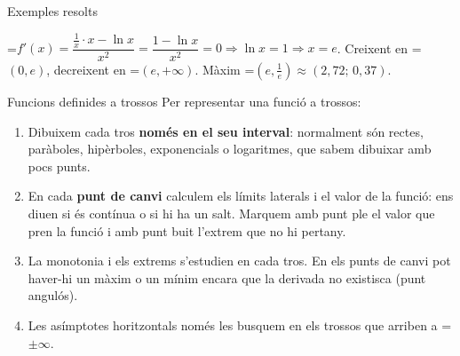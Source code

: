 \documentclass[11pt,a4paper]{article}
\newcommand{\fmm}[1]{\setbox0=\hbox{$#1$}\ifdim\wd0>\linewidth\[#1\]\else\mbox{\box0}\fi}
\begin{document}
\begin{fmex}{Exemples resolts}
\begin{enumerate}[label=\textbf{\arabic*.},leftmargin=*]
            

\fmm{f'(x)=\dfrac{\frac1x\cdot x-\ln x}{x^2}=\dfrac{1-\ln x}{x^2}=0\Rightarrow\ln x=1\Rightarrow x=e}. Creixent en \fmm{(0,e)}, decreixent en \fmm{(e,+\infty)}. Màxim \fmm{\left(e,\frac1e\right)\approx(2{,}72;\,0{,}37)}.

            

\begin{center}\end{center}
\end{enumerate}
\end{fmex}

  
\begin{fmdef}{Funcions definides a trossos}
Per representar una funció a trossos:

      
\begin{enumerate}
\item Dibuixem cada tros \textbf{només en el seu interval}: normalment són rectes, paràboles, hipèrboles, exponencials o logaritmes, que sabem dibuixar amb pocs punts.
\item En cada \textbf{punt de canvi} calculem els límits laterals i el valor de la funció: ens diuen si és contínua o si hi ha un salt. Marquem amb punt ple el valor que pren la funció i amb punt buit l'extrem que no hi pertany.
\item La monotonia i els extrems s'estudien en cada tros. En els punts de canvi pot haver-hi un màxim o un mínim encara que la derivada no existisca (punt angulós).
\item Les asímptotes horitzontals només les busquem en els trossos que arriben a \fmm{\pm\infty}.
\end{enumerate}
\end{fmdef}
\end{document}
